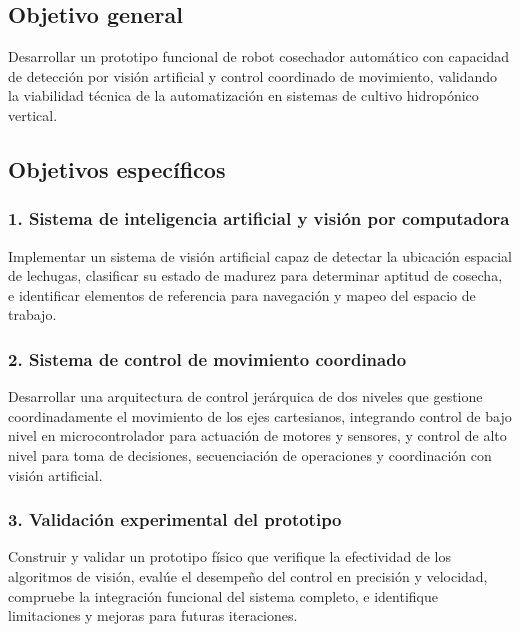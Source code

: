 
\subsection*{Objetivo general}

Desarrollar un prototipo funcional de robot cosechador automático con capacidad de detección por visión artificial y control coordinado de movimiento, validando la viabilidad técnica de la automatización en sistemas de cultivo hidropónico vertical.

\subsection*{Objetivos específicos}

\subsubsection*{1. Sistema de inteligencia artificial y visión por computadora}

Implementar un sistema de visión artificial capaz de detectar la ubicación espacial de lechugas, clasificar su estado de madurez para determinar aptitud de cosecha, e identificar elementos de referencia para navegación y mapeo del espacio de trabajo.

\subsubsection*{2. Sistema de control de movimiento coordinado}

Desarrollar una arquitectura de control jerárquica de dos niveles que gestione coordinadamente el movimiento de los ejes cartesianos, integrando control de bajo nivel en microcontrolador para actuación de motores y sensores, y control de alto nivel para toma de decisiones, secuenciación de operaciones y coordinación con visión artificial.

\subsubsection*{3. Validación experimental del prototipo}

Construir y validar un prototipo físico que verifique la efectividad de los algoritmos de visión, evalúe el desempeño del control en precisión y velocidad, compruebe la integración funcional del sistema completo, e identifique limitaciones y mejoras para futuras iteraciones.